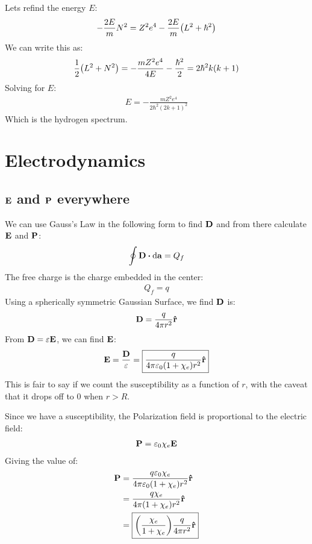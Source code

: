 \documentclass[12pt]{article}
\theoremstyle{plain}
\theoremstyle{definition}
\newcommand{\veps}{\varepsilon}
\begin{document}
Lets refind the energy $E$:
\begin{align*}
  -\frac{2E}{m}N^2=Z^2e^4-\frac{2E}{m}\qty(L^2+\hbar^2)
\end{align*}
We can write this as:
\begin{align*}
  \frac12\qty(L^2+N^2)=-\frac{mZ^2e^4}{4E}-\frac{\hbar^2}{2}=2\hbar^2k(k+1)
\end{align*}
Solving for $E$:
\begin{align*}
  E=-\frac{mZ^2e^4}{2\hbar^2(2k+1)^2}
\end{align*}
Which is the hydrogen spectrum.
\newpage
\section{Electrodynamics}
\subsection{$\vb{E}$ and $\vb{P}$ everywhere}
We can use Gauss's Law in the following form to find $\vb{D}$ and from there calculate $\vb{E}$ and $\vb{P}$:
\begin{align*}
  \oint\vb{D}\vdot\dd{\vb{a}}=Q_f
\end{align*}
The free charge is the charge embedded in the center:
\begin{align*}
  Q_f=q
\end{align*}
Using a spherically symmetric Gaussian Surface, we find $\vb{D}$ is:
\begin{align*}
  \vb{D}=\frac{q}{4\pi r^2}\vu{r}
\end{align*}
From $\vb{D}=\veps\vb{E}$, we can find $\vb{E}$:
\begin{align*}
  \vb{E}=\frac{\vb{D}}{\veps}=\boxed{\frac{q}{4\pi\veps_0(1+\chi_e)r^2}\vu{r}}
\end{align*}
This is fair to say if we count the susceptibility as a function of $r$, with the caveat that it drops off to $0$ when $r>R$.

Since we have a susceptibility, the Polarization field is proportional to the electric field:
\begin{align*}
  \vb{P}=\veps_0\chi_e\vb{E}
\end{align*}
Giving the value of:
\begin{align*}
  \vb{P}&=\frac{q\veps_0\chi_e}{4\pi\veps_0(1+\chi_e)r^2}\vu{r}\\
  &=\frac{q\chi_e}{4\pi(1+\chi_e)r^2}\vu{r}\\
  &=\boxed{\qty(\frac{\chi_e}{1+\chi_e})\frac{q}{4\pi r^2}\vu{r}}
\end{align*}
\end{document}
